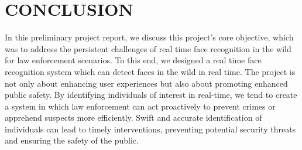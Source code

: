 \chapter{CONCLUSION}

In this preliminary project report, we discuss this project's core objective, which was to address the persistent challenges of real time face recognition in the wild for law enforcement scenarios. To this end, we designed a real time face recognition system which can detect faces in the wild in real time. The project is not only about enhancing user experiences but also about promoting enhanced public safety. By identifying individuals of interest in real-time, we tend to create a system in which law enforcement can act proactively to prevent crimes or apprehend suspects more efficiently. Swift and accurate identification of individuals can lead to timely interventions, preventing potential security threats and ensuring the safety of the public.
